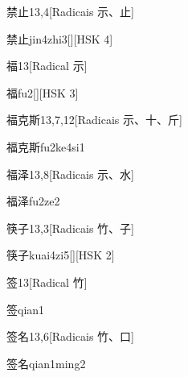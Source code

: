 \begin{entry}{禁止}{13,4}[Radicais ⽰、⽌]
  \begin{phonetics}{禁止}{jin4zhi3}[][HSK 4]
  \end{phonetics}
\end{entry}

\begin{entry}{福}{13}[Radical ⽰]
  \begin{phonetics}{福}{fu2}[][HSK 3]
  \end{phonetics}
\end{entry}

\begin{entry}{福克斯}{13,7,12}[Radicais ⽰、⼗、⽄]
  \begin{phonetics}{福克斯}{fu2ke4si1}
  \end{phonetics}
\end{entry}

\begin{entry}{福泽}{13,8}[Radicais ⽰、⽔]
  \begin{phonetics}{福泽}{fu2ze2}
  \end{phonetics}
\end{entry}

\begin{entry}{筷子}{13,3}[Radicais ⽵、⼦]
  \begin{phonetics}{筷子}{kuai4zi5}[][HSK 2]
  \end{phonetics}
\end{entry}

\begin{entry}{签}{13}[Radical ⽵]
  \begin{phonetics}{签}{qian1}
  \end{phonetics}
\end{entry}

\begin{entry}{签名}{13,6}[Radicais ⽵、⼝]
  \begin{phonetics}{签名}{qian1ming2}
  \end{phonetics}
\end{entry}

